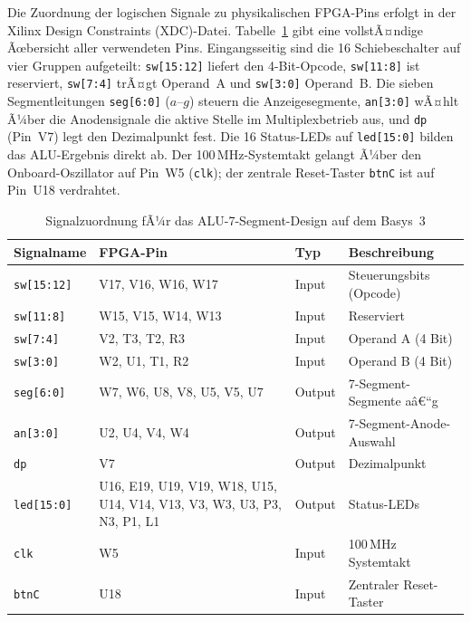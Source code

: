 ﻿\documentclass[12pt,a4paper]{report}
\begin{document}
Die Zuordnung der logischen Signale zu physikalischen FPGA-Pins erfolgt in der Xilinx Design Constraints (XDC)-Datei. Tabelle~\ref{tab:pin_assignment} gibt eine vollstÃ¤ndige Ãœbersicht aller verwendeten Pins.
Eingangsseitig sind die 16 Schiebeschalter auf vier Gruppen aufgeteilt: \texttt{sw[15:12]} liefert den 4-Bit-Opcode, \texttt{sw[11:8]} ist reserviert, \texttt{sw[7:4]} trÃ¤gt Operand~A und \texttt{sw[3:0]} Operand~B. Die sieben Segmentleitungen \texttt{seg[6:0]} ($a$--$g$) steuern die Anzeigesegmente, \texttt{an[3:0]} wÃ¤hlt Ã¼ber die Anodensignale die aktive Stelle im Multiplexbetrieb aus, und \texttt{dp} (Pin~V7) legt den Dezimalpunkt fest. Die 16 Status-LEDs auf \texttt{led[15:0]} bilden das ALU-Ergebnis direkt ab. Der 100\,MHz-Systemtakt gelangt Ã¼ber den Onboard-Oszillator auf Pin~W5 (\texttt{clk}); der zentrale Reset-Taster \texttt{btnC} ist auf Pin~U18 verdrahtet.

\begin{table}
\centering
\begin{tabular}{|l|l|l|l|}
\hline
\textbf{Signalname} & \textbf{FPGA-Pin} & \textbf{Typ} & \textbf{Beschreibung} \\
\hline
\texttt{sw[15:12]} & V17, V16, W16, W17 & Input & Steuerungsbits (Opcode) \\
\texttt{sw[11:8]}  & W15, V15, W14, W13 & Input & Reserviert \\
\texttt{sw[7:4]}   & V2, T3, T2, R3     & Input & Operand A (4 Bit) \\
\texttt{sw[3:0]}   & W2, U1, T1, R2     & Input & Operand B (4 Bit) \\
\texttt{seg[6:0]}  & W7, W6, U8, V8, U5, V5, U7 & Output & 7-Segment-Segmente aâ€“g \\
\texttt{an[3:0]}   & U2, U4, V4, W4     & Output & 7-Segment-Anode-Auswahl \\
\texttt{dp}        & V7                  & Output & Dezimalpunkt \\
\texttt{led[15:0]} & U16, E19, U19, V19, W18, U15, U14, V14, V13, V3, W3, U3, P3, N3, P1, L1 & Output & Status-LEDs \\
\texttt{clk}       & W5                  & Input & 100\,MHz Systemtakt \\
\texttt{btnC}      & U18                 & Input & Zentraler Reset-Taster \\
\hline
\end{tabular}
\caption{Signalzuordnung fÃ¼r das ALU-7-Segment-Design auf dem Basys~3}
\label{tab:pin_assignment}
\end{table}
\end{document}
